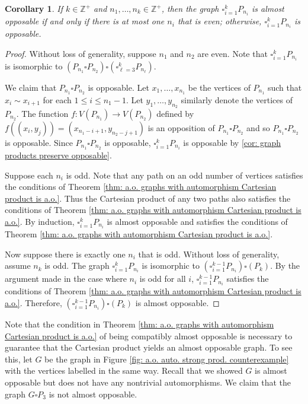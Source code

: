 \documentclass[11pt]{article}
\newtheorem{corollary}[theorem]{Corollary}
\theoremstyle{definition}
\begin{document}
\begin{corollary}
    \label{cor: k-dim Cartesian grids}
    If $k\in \mathbb{Z}^+$ and $n_1,\dots, n_k \in \mathbb{Z}^+$, then the
    graph $\square^k_{i=1} P_{n_i}$ is almost opposable if and only if there is
    at most one $n_i$ that is even; otherwise, $\square^k_{i=1} P_{n_i}$ is
    opposable.
\end{corollary}

\begin{proof}
    Without loss of generality, suppose $n_1$ and $n_2$ are even. Note that
    $\square^k_{i=1} P_{n_i}$ is isomorphic to $(P_{n_1} \square P_{n_2})
    \square (\square_{\ell = 3}^k P_{n_\ell})$.

    We claim that $P_{n_1} \square P_{n_2}$ is opposable. Let $x_1, \dots,
    x_{n_1}$ be the vertices of $P_{n_1}$ such that $x_i \sim x_{i+1}$ for each
    $1\leq i\leq n_1 - 1$. Let $y_1, \dots, y_{n_2}$ similarly denote the
    vertices of $P_{n_2}$. The function $f: V(P_{n_1}) \to V(P_{n_2})$ defined
    by $f((x_i, y_j)) = (x_{n_1 - i + 1}, y_{n_2 - j + 1})$ is an opposition of
    $P_{n_1} \square P_{n_2}$ and so $P_{n_1} \square P_{n_2}$ is opposable.
    Since $P_{n_1} \square P_{n_2}$ is opposable, $\square^k_{i=1} P_{n_i}$ is
    opposable by \cref{cor: graph products preserve opposable}. 

    Suppose each $n_i$ is odd. Note that any path on an odd number of vertices
    satisfies the conditions of Theorem \ref{thm: a.o. graphs with automorphism
    Cartesian product is a.o.}. Thus the Cartesian product of any two paths
    also satisfies the conditions of Theorem \ref{thm: a.o. graphs with
    automorphism Cartesian product is a.o.}. By induction, $\square^k_{i=1}
    P_{n_i}$ is almost opposable and satisfies the conditions of Theorem
    \ref{thm: a.o. graphs with automorphism Cartesian product is a.o.}.

    Now suppose there is exactly one $n_i$ that is odd. Without loss of
    generality, assume $n_k$ is odd. The graph $\square^k_{i=1} P_{n_i}$ is
    isomorphic to $(\square^{k-1}_{i=1} P_{n_i}) \square (P_k)$. By the
    argument made in the case where $n_i$ is odd for all $i$,
    $\square^{k-1}_{i=1} P_{n_i}$ satisfies the conditions of Theorem \ref{thm:
    a.o. graphs with automorphism Cartesian product is a.o.}. Therefore,
    $(\square^{k-1}_{i=1} P_{n_i}) \square (P_k)$ is almost opposable. 
\end{proof}

Note that the condition in Theorem \ref{thm: a.o. graphs with automorphism
Cartesian product is a.o.} of being compatibly almost opposable is necessary to
guarantee that the Cartesian product yields an almost opposable graph. To see
this, let $G$ be the graph in Figure \ref{fig: a.o. auto. strong prod.
counterexample} with the vertices labelled in the same way. Recall that we
showed $G$ is almost opposable but does not have any nontrivial automorphisms.
We claim that the graph $G\square P_3$ is not almost opposable. 
\end{document}
